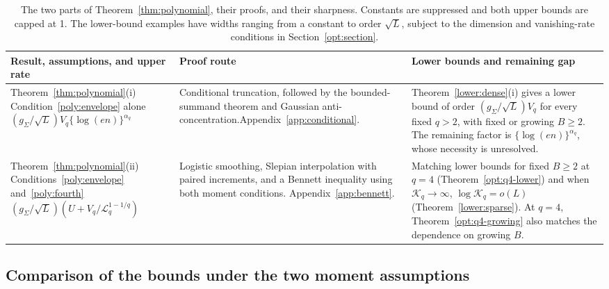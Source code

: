 \documentclass[11pt,letterpaper]{article}
\theoremstyle{remark}
\begin{document}
\begin{table}[htbp]
\centering

\small
\renewcommand{\arraystretch}{1.15}
\begin{tabularx}{\textwidth}{@{}>{\raggedright\arraybackslash}p{}
 >{\raggedright\arraybackslash}p{}
 >{\raggedright\arraybackslash}X@{}}
\toprule
Result, assumptions, and upper rate & Proof route & Lower bounds and remaining gap\\
\midrule
Theorem~\ref{thm:polynomial}\textup{(i)}\newline
Condition~\eqref{poly:envelope} alone\newline
\((g_\Sigma/\sqrt L)V_q\{\log(en)\}^{\alpha_q}\)
& Conditional truncation, followed by the bounded-summand theorem and
Gaussian anti-concentration.\newline Appendix~\ref{app:conditional}.
& Theorem~\ref{lower:dense}\textup{(i)} gives a lower bound of order
\((g_\Sigma/\sqrt L)V_q\) for every fixed \(q>2\),
with fixed or growing \(B\ge2\).
The remaining factor is \(\{\log(en)\}^{\alpha_q}\), whose
necessity is unresolved.\\[0.6em]
Theorem~\ref{thm:polynomial}\textup{(ii)}\newline
Conditions~\eqref{poly:envelope} and~\eqref{poly:fourth}\newline
\((g_\Sigma/\sqrt L)(U+V_q/\mathcal L_q^{1-1/q})\)
& Logistic smoothing, Slepian interpolation with paired increments, and
a Bennett inequality using both moment conditions.\newline
Appendix~\ref{app:bennett}.
& Matching lower bounds for fixed \(B\ge2\) at \(q=4\)
(Theorem~\ref{opt:q4-lower}) and when \(\mathcal K_q\to\infty\), \(\log\mathcal K_q=o(L)\)
(Theorem~\ref{lower:sparse}). At \(q=4\),
Theorem~\ref{opt:q4-growing} also matches the dependence on growing \(B\).\\
\bottomrule
\end{tabularx}
\caption{The two parts of Theorem~\ref{thm:polynomial}, their proofs,
and their sharpness. Constants are suppressed and both upper bounds
are capped at 1. The lower-bound examples have widths
ranging from a constant to order \(\sqrt L\), subject to the
dimension and vanishing-rate conditions in Section~\ref{opt:section}.}
\label{poly:summary}
\end{table}

\subsection{\texorpdfstring{{Comparison of the bounds under the two moment assumptions}}{Comparison of the bounds under the two moment assumptions}}\label{poly:transition}
\end{document}
